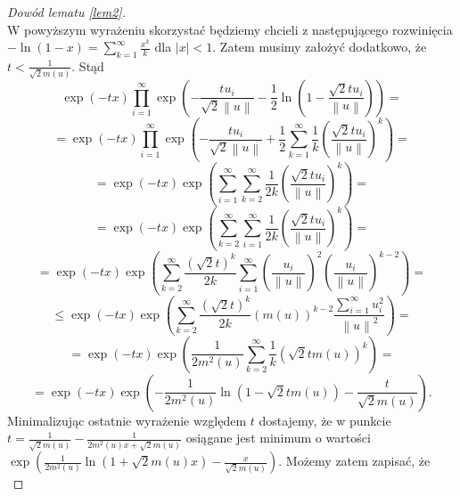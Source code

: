 \documentclass{mwart}
\newcommand{\norm}[1]{\left\lVert#1\right\rVert}
\begin{document}
\begin{proof}[Dowód lematu \ref{lem2}]
\begin{displaymath}
\end{displaymath}
W powyższym wyrażeniu skorzystać będziemy chcieli z następującego rozwinięcia $-\ln (1-x)=\sum_{k=1}^{\infty}\frac{x^k}{k}$ dla $|x|<1$. Zatem musimy założyć dodatkowo, że $t<\frac{1}{\sqrt{2}m(u)}$. Stąd
\begin{displaymath}
\exp(-tx)\prod_{i=1}^{\infty}\exp\left(-\frac{tu_i}{\sqrt{2}\norm{u}}-\frac{1}{2}\ln\left(1-\frac{\sqrt{2}tu_i}{\norm{u}}\right)\right)=
\end{displaymath}
\begin{displaymath}
=\exp(-tx)\prod_{i=1}^{\infty}\exp\left(-\frac{tu_i}{\sqrt{2}\norm{u}}+\frac{1}{2}\sum_{k=1}^{\infty}\frac{1}{k}\left(\frac{\sqrt{2}tu_i}{\norm{u}}\right)^k\right)=
\end{displaymath}
\begin{displaymath}
=\exp(-tx)\exp \left(\sum_{i=1}^{\infty}\sum_{k=2}^{\infty}\frac{1}{2k}\left(\frac{\sqrt{2}tu_i}{\norm{u}}\right)^k\right)=
\end{displaymath}
\begin{displaymath}
=\exp(-tx)\exp \left(\sum_{k=2}^{\infty}\sum_{i=1}^{\infty}\frac{1}{2k}\left(\frac{\sqrt{2}tu_i}{\norm{u}}\right)^k\right)=
\end{displaymath}
\begin{displaymath}
=\exp(-tx)\exp \left(\sum_{k=2}^{\infty}\frac{(\sqrt{2}t)^k}{2k}\sum_{i=1}^{\infty}\left(\frac{u_i}{\norm{u}}\right)^2\left(\frac{u_i}{\norm{u}}\right)^{k-2}\right)=
\end{displaymath}
\begin{displaymath}
\leq \exp(-tx)\exp \left(\sum_{k=2}^{\infty}\frac{(\sqrt{2}t)^k}{2k}(m(u))^{k-2}\frac{\sum_{i=1}^{\infty}u_i^2}{\norm{u}^2}\right)=
\end{displaymath}
\begin{displaymath}
=\exp(-tx)\exp \left(\frac{1}{2m^2(u)}\sum_{k=2}^{\infty}\frac{1}{k}\left(\sqrt{2}tm(u)\right)^k\right)=
\end{displaymath}
\begin{displaymath}
=\exp(-tx)\exp \left(-\frac{1}{2m^2(u)}\ln \left(1-\sqrt{2}tm(u)\right)-\frac{t}{\sqrt{2}m(u)}\right).
\end{displaymath}
Minimalizując ostatnie wyrażenie względem $t$ dostajemy, że w punkcie $t=\frac{1}{\sqrt{2}m(u)}-\frac{1}{2m^2(u)x+\sqrt{2}m(u)}$ osiągane jest minimum o wartości\\ $\exp\left(\frac{1}{2m^2(u)}\ln \left(1+\sqrt{2}m(u)x\right)-\frac{x}{\sqrt{2}m(u)}\right)$. Możemy zatem zapisać, że
\begin{displaymath}

\end{displaymath}
\end{proof}
\end{document}
